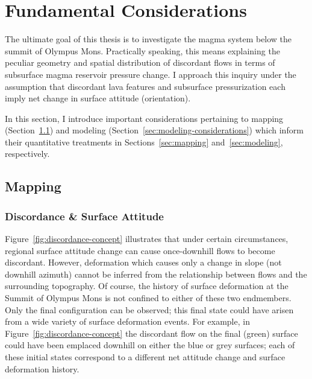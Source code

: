 \section{Fundamental Considerations}\label{sec:considerations}

The ultimate goal of this thesis is to investigate the magma system below the summit of Olympus Mons. Practically speaking, this means explaining the peculiar geometry and spatial distribution of discordant flows in terms of subsurface magma reservoir pressure change. I approach this inquiry under the assumption that discordant lava features and subsurface pressurization each imply net change in surface attitude (orientation). 

In this section, I introduce important considerations pertaining to mapping (Section~\ref{sec:mapping-considerations}) and modeling (Section~\ref{sec:modeling-considerations}) which inform their quantitative treatments in Sections~\ref{sec:mapping} and~\ref{sec:modeling}, respectively.

\subsection{Mapping}\label{sec:mapping-considerations}

\subsubsection{Discordance \& Surface Attitude}\label{sec:downhill-flows}

Figure~\ref{fig:discordance-concept} illustrates that under certain circumstances, regional surface attitude change can cause once-downhill flows to become discordant. However, deformation which causes only a change in slope (not downhill azimuth) cannot be inferred from the relationship between flows and the surrounding topography. Of course, the history of surface deformation at the Summit of Olympus Mons is not confined to either of these two endmembers. Only the final configuration can be observed; this final state could have arisen from a wide variety of surface deformation events. For example, in Figure~\ref{fig:discordance-concept} the discordant flow on the final (green) surface could have been emplaced downhill on either the blue or grey surfaces; each of these initial states correspond to a different net attitude change and surface deformation history.

